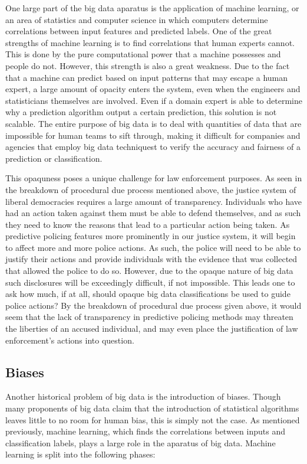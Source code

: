 \documentclass[12pt]{article} %
\begin{document}
One large part of the big data aparatus is the application of machine learning, or an area of statistics and computer science in which computers determine correlations between input features and predicted labels. %
One of the great strengths of machine learning is to find correlations that human experts cannot. This is done by the pure computational power that a machine possesses and people do not. However, this strength is also a great weakness. Due to the fact that a machine can predict based on input patterns that may escape a human expert, a large amount of opacity enters the system, even when the engineers and statisticians themselves are involved. Even if a domain expert is able to determine why a prediction algorithm output a certain prediction, this solution is not scalable. The entire purpose of big data is to deal with quantities of data that are impossible for human teams to sift through, making it difficult for companies and agencies that employ big data techniquest to verify the accuracy and fairness of a prediction or classification.

This opaquness poses a unique challenge for law enforcement purposes. As seen in the breakdown of procedural due process mentioned above, the justice system of liberal democracies requires a large amount of transparency. Individuals who have had an action taken against them must be able to defend themselves, and as such they need to know the reasons that lead to a particular action being taken. As predictive policing features more prominently in our justice system, it will begin to affect more and more police actions. As such, the police will need to be able to justify their actions and provide individuals with the evidence that was collected that allowed the police to do so. However, due to the opaque nature of big data such disclosures will be exceedingly difficult, if not impossible. This leads one to ask how much, if at all, should opaque big data classifications be used to guide police actions? By the breakdown of procedural due process given above, it would seem that the lack of transparency in predictive policing methods may threaten the liberties of an accused individual, and may even place the justification of law enforcement's actions into question.

\subsection{Biases}\label{subsec:biases}
Another historical problem of big data is the introduction of biases. Though many proponents of big data claim that the introduction of statistical algorithms leaves little to no room for human bias, this is simply not the case.\cite{hardt} As mentioned previously, machine learning, which finds the correlations between inputs and classification labels, plays a large role in the aparatus of big data. Machine learning is split into the following phases:
\end{document}
